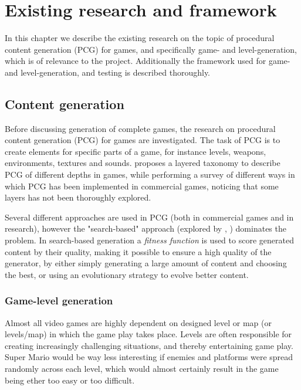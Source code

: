 \documentclass[a4paper,titlepage,final]{report}
\begin{document}
\chapter{Existing research and framework}
\label{ch_existingresearch}
In this chapter we describe the existing research on the topic of procedural content generation (PCG) for games, and specifically game- and level-generation, which is of relevance to the project.
Additionally the framework used for game- and level-generation, and testing is described thoroughly.



\section{Content generation}
\label{sec_contengen}
Before discussing generation of complete games, the research on procedural content generation (PCG) for games are investigated. 
The task of PCG is to create elements for specific parts of a game, for instance levels, weapons, environments, textures and sounds. 
\citet{hendrikx2013procedural} proposes a layered taxonomy to describe PCG of different depths in games, while performing a survey of different ways in which PCG has been implemented in commercial games, noticing that some layers has not been thoroughly explored.

Several different approaches are used in PCG (both in commercial games and in research), however the "search-based" approach (explored by \citet{togelius11search}, \citet{pcgbook:ch2}) dominates the problem.
In search-based generation a \textit{fitness function} is used to score generated content by their quality, making it possible to ensure a high quality of the generator, by either simply generating a large amount of content and choosing the best, or using an evolutionary strategy to evolve better content.




\subsection{Game-level generation}
Almost all video games are highly dependent on designed level or map (or levels/map) in which the game play takes place. Levels are often responsible for creating increasingly challenging situations, and thereby entertaining game play. Super Mario would be way less interesting if enemies and platforms were spread randomly across each level, which would almost certainly result in the game being ether too easy or too difficult.
\end{document}
